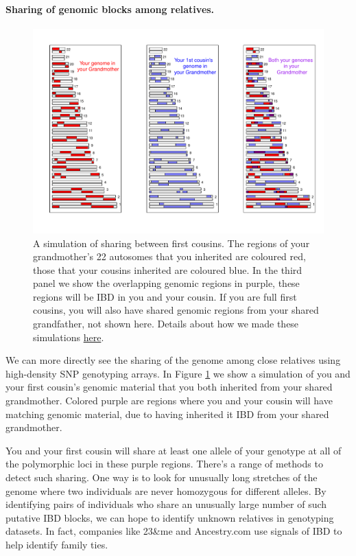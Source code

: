 {{\paragraph{Sharing of genomic blocks among relatives.}
\begin{figure}
\begin{center}
\includegraphics[width= \textwidth]{figures/sharing_relatives/First_cousin_overlap.pdf}
\end{center}
\caption[]{A simulation of sharing between first cousins. The regions of your grandmother's 22 autosomes that you inherited are
coloured red, those that your cousins inherited are coloured blue. In the third panel we show the overlapping genomic regions in purple, these regions will be IBD in you and your cousin. If you are full first cousins, you will also have shared genomic regions from your shared grandfather, not shown here. Details about how we made these simulations \href{https://gcbias.org/2013/12/02/how-many-genomic-blocks-do-you-share-with-a-cousin/}{here}.
} \label{fig:first_cousin_IBD}
\end{figure}
We can more directly see the sharing of the genome among close
relatives using high-density SNP genotyping arrays. In Figure \ref{fig:first_cousin_IBD} we show a simulation of you and your first cousin's genomic material that you both inherited from your shared grandmother. Colored purple are regions where you and your cousin will have matching genomic material, due to having inherited it IBD from your shared grandmother.



You and your first cousin will share at least one allele of your genotype at all of the polymorphic loci in these purple regions. There's a range of methods to detect such sharing. One way is to look for unusually long stretches of the genome where two individuals are never homozygous for different alleles. By identifying pairs of individuals who share an unusually large number of such putative IBD blocks, we can hope to identify unknown relatives in genotyping datasets. In fact, companies like 23\&me and Ancestry.com use signals of IBD to help identify family ties.

}}

